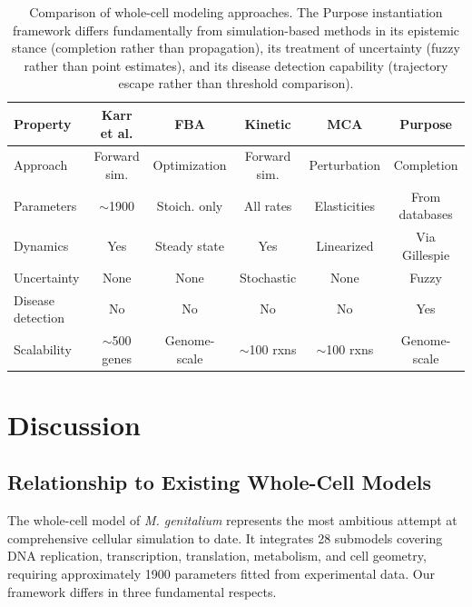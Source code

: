 \documentclass[twocolumn,10pt,a4paper]{article}
\theoremstyle{definition}
\theoremstyle{remark}
\begin{document}
\begin{table}[t]
\centering
\caption{Comparison of whole-cell modeling approaches. The Purpose instantiation framework differs fundamentally from simulation-based methods in its epistemic stance (completion rather than propagation), its treatment of uncertainty (fuzzy rather than point estimates), and its disease detection capability (trajectory escape rather than threshold comparison).}
\label{tab:comparison}
\begin{tabular}{@{}lccccc@{}}
\toprule
\textbf{Property} & \textbf{Karr et al.} & \textbf{FBA} & \textbf{Kinetic} & \textbf{MCA} & \textbf{Purpose} \\
\midrule
Approach & Forward sim. & Optimization & Forward sim. & Perturbation & Completion \\
Parameters & $\sim$1900 & Stoich. only & All rates & Elasticities & From databases \\
Dynamics & Yes & Steady state & Yes & Linearized & Via Gillespie \\
Uncertainty & None & None & Stochastic & None & Fuzzy \\
Disease detection & No & No & No & No & Yes \\
Scalability & $\sim$500 genes & Genome-scale & $\sim$100 rxns & $\sim$100 rxns & Genome-scale \\
\bottomrule
\end{tabular}
\end{table}

\section{Discussion}
\label{sec:discussion}

\subsection{Relationship to Existing Whole-Cell Models}

The \citet{Karr2012} whole-cell model of \emph{M. genitalium} represents the most ambitious attempt at comprehensive cellular simulation to date. It integrates 28 submodels covering DNA replication, transcription, translation, metabolism, and cell geometry, requiring approximately 1900 parameters fitted from experimental data. Our framework differs in three fundamental respects.
\end{document}

